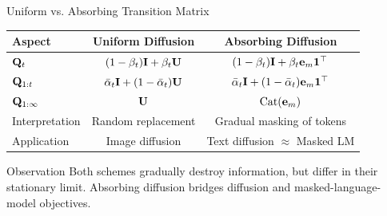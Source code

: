 \documentclass{beamer}
\begin{document}
\begin{frame}{Uniform vs. Absorbing Transition Matrix}
	\begin{table}[h!]
		\centering
		\small
		\begin{tabular}{lcc}
			\toprule
			\textbf{Aspect} & \textbf{Uniform Diffusion} & \textbf{Absorbing Diffusion} \\
			\midrule
			$\mathbf{Q}_t$
				& $(1-\beta_t)\mathbf{I} + \beta_t \mathbf{U}$ 
				& $(1-\beta_t)\mathbf{I} + \beta_t \mathbf{e}_m\mathbf{1}^\top$ \\[4pt]
			$\mathbf{Q}_{1:t}$
				& $\bar\alpha_t \mathbf{I} + (1-\bar\alpha_t)\mathbf{U}$
				& $\bar\alpha_t \mathbf{I} + (1-\bar\alpha_t)\mathbf{e}_m\mathbf{1}^\top$ \\[4pt]
			$\mathbf{Q}_{1:\infty}$
				& $\mathbf{U}$
				& $\operatorname{Cat}(\mathbf{e}_m)$ \\[4pt]
			Interpretation
				& Random replacement
				& Gradual masking of tokens \\[4pt]
			Application
				& Image diffusion
				& Text diffusion $\approx$ Masked LM \\[4pt]
			\bottomrule
		\end{tabular}
	\end{table}
	\eqpause
	\begin{block}{Observation}
		Both schemes gradually destroy information, but differ in their stationary limit.
		Absorbing diffusion bridges diffusion and masked-language-model objectives.
	\end{block}
\end{frame}
\end{document}
